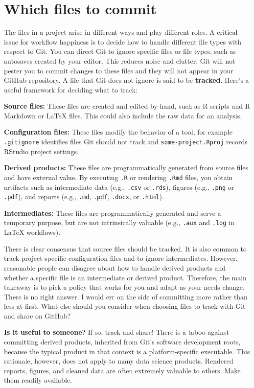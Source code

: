 \documentclass[12pt]{article}
\begin{document}
\section{Which files to commit}\label{which-files-to-commit}

The files in a project arise in different ways and play different roles.
A critical issue for workflow happiness is to decide how to handle
different file types with respect to Git. You can direct Git to ignore
specific files or file types, such as autosaves created by your editor.
This reduces noise and clutter: Git will not pester you to commit
changes to these files and they will not appear in your GitHub
repository. A file that Git does not ignore is said to be
\textbf{tracked}. Here's a useful framework for deciding what to track:

\textbf{Source files:} These files are created and edited by hand, such
as R scripts and R Markdown or LaTeX files. This could also include the
raw data for an analysis.

\textbf{Configuration files:} These files modify the behavior of a tool,
for example \texttt{.gitignore} identifies files Git should not track
and \texttt{some-project.Rproj} records RStudio project settings.

\textbf{Derived products:} These files are programmatically generated
from source files and have external value. By executing \texttt{.R} or
rendering \texttt{.Rmd} files, you obtain artifacts such as intermediate
data (e.g., \texttt{.csv} or \texttt{.rds}), figures (e.g.,
\texttt{.png} or \texttt{.pdf}), and reports (e.g., \texttt{.md},
\texttt{.pdf}, \texttt{.docx}, or \texttt{.html}).

\textbf{Intermediates:} These files are programmatically generated and
serve a temporary purpose, but are not intrinsically valuable (e.g.,
\texttt{.aux} and \texttt{.log} in LaTeX workflows).

There is clear consensus that source files should be tracked. It is also
common to track project-specific configuration files and to ignore
intermediates. However, reasonable people can disagree about how to
handle derived products and whether a specific file is an intermediate
or derived product. Therefore, the main takeaway is to pick a policy
that works for you and adapt as your needs change. There is no right
answer. I would err on the side of committing more rather than less at
first. What else should you consider when choosing files to track with
Git and share on GitHub?

\textbf{Is it useful to someone?} If so, track and share! There is a
taboo against committing derived products, inherited from Git's software
development roots, because the typical product in that context is a
platform-specific executable. This rationale, however, does not apply to
many data science products. Rendered reports, figures, and cleaned data
are often extremely valuable to others. Make them readily available.
\end{document}
